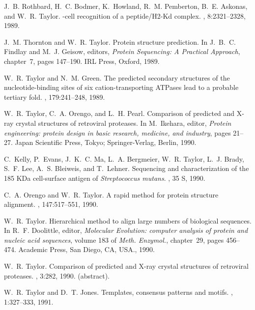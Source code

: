 \begin{thebibliography}{100}
J.~B. Rothbard, H.~C. Bodmer, K.~Howland, R.~M. Pemberton, B.~E. Askonas, and
  W.~R. Taylor.
-cell recognition of a peptide/{H2-Kd} complex.
, 8:2321--2328, 1989.

J.~M. Thornton and W.~R. Taylor.
\newblock Protein structure prediction.
\newblock In J.~B.~C. Findlay and M.~J. Geisow, editors, {\em Protein
  Sequencing: A Practical Approach}, chapter~7, pages 147--190. IRL Press,
  Oxford, 1989.

W.~R. Taylor and N.~M. Green.
\newblock The predicted secondary structures of the nucleotide-binding sites of
  six cation-transporting {ATPases} lead to a probable tertiary fold.
, 179:241--248, 1989.

W.~R. Taylor, C.~A. Orengo, and L.~H. Pearl.
\newblock Comparison of predicted and {X}-ray crystal structures of retroviral
  proteases.
\newblock In M.~Ikehara, editor, {\em Protein engineering: protein design in
  basic research, medicine, and industry}, pages 21--27. Japan Scientific
  Press, Tokyo; Springer-Verlag, Berlin, 1990.

C.~Kelly, P.~Evans, J.~K.~C. Ma, L.~A. Bergmeier, W.~R. Taylor, L.~J. Brady,
  S.~F. Lee, A.~S. Bleiweis, and T.~Lehner.
\newblock Sequencing and characterization of the 185 {KD}a cell-surface antigen
  of {{\em Streptococcus mutans}}.
, 35 S, 1990.

C.~A. Orengo and W.~R. Taylor.
\newblock A rapid method for protein structure alignment.
, 147:517--551, 1990.

W.~R. Taylor.
\newblock Hierarchical method to align large numbers of biological sequences.
\newblock In R.~F. Doolittle, editor, {\em Molecular Evolution: computer
  analysis of protein and nucleic acid sequences}, volume 183 of {\em Meth.
  Enzymol.}, chapter~29, pages 456--474. Academic Press, San Diego, CA, USA.,
  1990.

W.~R. Taylor.
\newblock Comparison of predicted and {X}-ray crystal structures of retroviral
  proteases.
, 3:282, 1990.
\newblock (abstract).

W.~R. Taylor and D.~T. Jones.
\newblock Templates, consensus patterns and motifs.
, 1:327--333, 1991.


\end{thebibliography}
